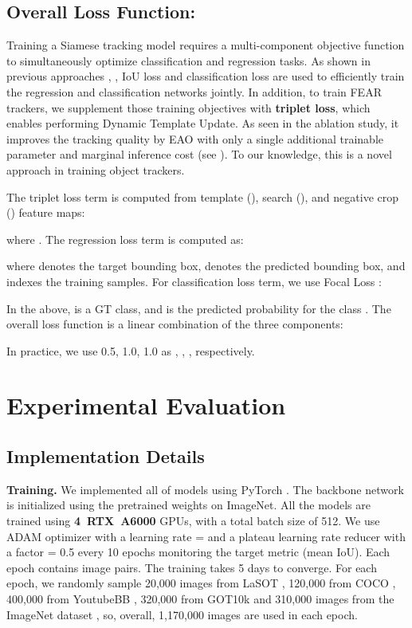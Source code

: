 \documentclass[runningheads]{llncs}
\begin{document}
\subsection{Overall Loss Function:} Training a Siamese tracking model requires a multi-component objective function to simultaneously optimize classification and regression tasks. 
As shown in previous approaches \cite{Ocean}, \cite{STARK}, IoU loss \cite{IoUloss} and classification loss are used to efficiently train the regression and classification networks jointly. In addition, to train FEAR trackers, we supplement those training objectives with \textbf{triplet loss}, which enables performing Dynamic Template Update. As seen in the ablation study, it improves the tracking quality by  EAO with only a single additional trainable parameter and marginal inference cost (see ). To our knowledge, this is a novel approach in training object trackers.

The triplet loss term is computed from template (), search (), and negative crop () feature maps:
 
where .
The regression loss term is computed as:
 
where  denotes the target bounding box,  denotes the predicted bounding box, and  indexes the training samples.
For classification loss term, we use Focal Loss \cite{FocalLoss}:
 

In the above,  is a GT class, and  is the predicted probability for the class .
The overall loss function is a linear combination of the three components:
 
In practice, we use 0.5, 1.0, 1.0 as , , , respectively. 

\section{Experimental Evaluation}\label{section4}

\subsection{Implementation Details}

\textbf{Training.} We implemented all of models using PyTorch \cite{pytorch}. The backbone network is initialized using the pretrained weights on ImageNet. All the models are trained using \textbf{4~RTX~A6000} GPUs, with a total batch size of 512. We use ADAM \cite{ADAM} optimizer with a learning rate =  and a plateau learning rate reducer with a factor = 0.5 every 10 epochs monitoring the target metric (mean IoU). Each epoch contains  image pairs. The training takes 5 days to converge.
For each epoch, we randomly sample 20,000 images from LaSOT \cite{LaSOT}, 120,000 from COCO \cite{COCO}, 400,000 from YoutubeBB \cite{YouTubeBB}, 320,000 from GOT10k \cite{GOT10k} and 310,000 images from the ImageNet dataset \cite{ImageNet}, so, overall, 1,170,000 images are used in each epoch. 
\end{document}
